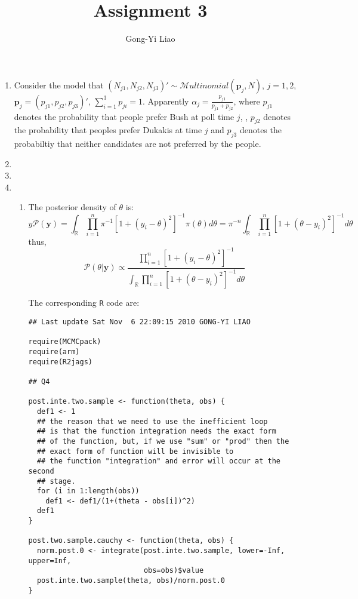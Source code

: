 \documentclass[twoside,12pt]{amsart}
\author{Gong-Yi Liao}
\title{Assignment 3}
\begin{document}
\maketitle

\begin{enumerate}
\item
  Consider the model that $(N_{j1}, N_{j2}, N_{j3})'\sim\mathcal
  Multinomial(\bm p_j, N)$, $j=1,2$, $\bm p_j = (p_{j1}, p_{j2},
  p_{j3})'$, $\sum_{i=1}^3p_{ji} = 1$. Apparently $\alpha_j =
  \frac{p_{j1}}{p_{j1}+p_{j2}}$, 
  where $p_{j1}$ denotes the probability that people prefer Bush at
  poll time $j$, , $p_{j2}$ denotes the probability that peoples
  prefer Dukakis at time $j$ and $p_{j3}$ denotes the probabiltiy that
  neither candidates are not preferred by the people. 
  
\item
\item
\item
  \begin{enumerate}
  \item The posterior density of $\theta$ is:
    \[ 
y    \mathscr P(\bm y) = 
    \int_{\mathbb R}\prod_{i=1}^n\pi^{-1}[1 +
    (y_i-\theta)^2]^{-1}\pi(\theta)d\theta = \pi^{-n}\int_{\mathbb R}\prod_{i=1}^n[1 +
    (\theta-y_i)^2]^{-1}d\theta 
    \]
    thus,
    \[ 
    \mathscr P(\theta|\bm y) \propto \frac{\prod_{i=1}^n[1 +
    (y_i-\theta)^2]^{-1}}{\int_{\mathbb R}\prod_{i=1}^n[1 +
    (\theta-y_i)^2]^{-1}d\theta}
    \]

    The corresponding {\tt R} code are:

    \begin{small}
    \begin{verbatim}
## Last update Sat Nov  6 22:09:15 2010 GONG-YI LIAO

require(MCMCpack)
require(arm)
require(R2jags)

## Q4

post.inte.two.sample <- function(theta, obs) {
  def1 <- 1
  ## the reason that we need to use the inefficient loop
  ## is that the function integration needs the exact form
  ## of the function, but, if we use "sum" or "prod" then the
  ## exact form of function will be invisible to
  ## the function "integration" and error will occur at the second
  ## stage.
  for (i in 1:length(obs))
    def1 <- def1/(1+(theta - obs[i])^2)
  def1
}

post.two.sample.cauchy <- function(theta, obs) {
  norm.post.0 <- integrate(post.inte.two.sample, lower=-Inf, upper=Inf, 
                           obs=obs)$value
  post.inte.two.sample(theta, obs)/norm.post.0
}


\end{verbatim}
\end{small}
\end{enumerate}
\end{enumerate}
\end{document}
